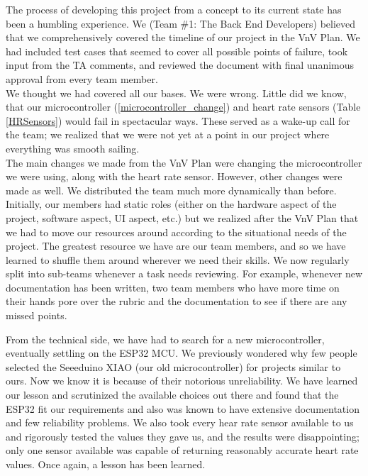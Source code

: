 \documentclass[12pt, titlepage]{article}
\begin{document}
The process of developing this project from a concept to its current state has been a humbling experience. We (Team \#1: The Back End Developers) believed that we comprehensively covered the timeline of our project in the VnV Plan. We had included test cases that seemed to cover all possible points of failure, took input from the TA comments, and reviewed the document with final unanimous approval from every team member.\\

We thought we had covered all our bases. We were wrong. Little did we know, that our microcontroller (\ref{microcontroller_change}) and heart rate sensors (Table \ref{HRSensors}) would fail in spectacular ways. These served as a wake-up call for the team; we realized that we were not yet at a point in our project where everything was smooth sailing.\\

The main changes we made from the VnV Plan were changing the microcontroller we were using, along with the heart rate sensor. However, other changes were made as well. We distributed the team much more dynamically than before. Initially, our members had static roles (either on the hardware aspect of the project, software aspect, UI aspect, etc.) but we realized after the VnV Plan that we had to move our resources around according to the situational needs of the project. The greatest resource we have are our team members, and so we have learned to shuffle them around wherever we need their skills. We now regularly split into sub-teams whenever a task needs reviewing. For example, whenever new documentation has been written, two team members who have more time on their hands pore over the rubric and the documentation to see if there are any missed points.

From the technical side, we have had to search for a new microcontroller, eventually settling on the ESP32 MCU. We previously wondered why few people selected the Seeeduino XIAO (our old microcontroller) for projects similar to ours. Now we know it is because of their notorious unreliability. We have learned our lesson and scrutinized the available choices out there and found that the ESP32 fit our requirements and also was known to have extensive documentation and few reliability problems. We also took every hear rate sensor available to us and rigorously tested the values they gave us, and the results were disappointing; only one sensor available was capable of returning reasonably accurate heart rate values. Once again, a lesson has been learned. \\
\end{document}
